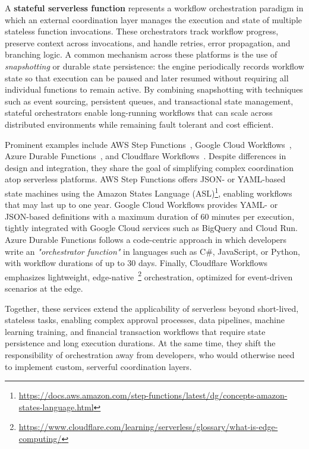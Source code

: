 A \textbf{stateful serverless function} represents a workflow orchestration paradigm in which an external coordination layer manages the execution and state of multiple stateless function invocations. These orchestrators track workflow progress, preserve context across invocations, and handle retries, error propagation, and branching logic. A common mechanism across these platforms is the use of \textit{snapshotting} or durable state persistence: the engine periodically records workflow state so that execution can be paused and later resumed without requiring all individual functions to remain active. By combining snapshotting with techniques such as event sourcing, persistent queues, and transactional state management, stateful orchestrators enable long-running workflows that can scale across distributed environments while remaining fault tolerant and cost efficient.

Prominent examples include AWS Step Functions~\cite{aws_step_functions}, Google Cloud Workflows~\cite{google_cloud_workflows}, Azure Durable Functions~\cite{azure_durable_functions}, and Cloudflare Workflows~\cite{cloudflare_workflows}. Despite differences in design and integration, they share the goal of simplifying complex coordination atop serverless platforms. AWS Step Functions offers JSON- or YAML-based state machines using the Amazon States Language (ASL)\footnote{\url{https://docs.aws.amazon.com/step-functions/latest/dg/concepts-amazon-states-language.html}}, enabling workflows that may last up to one year. Google Cloud Workflows provides YAML- or JSON-based definitions with a maximum duration of 60 minutes per execution, tightly integrated with Google Cloud services such as BigQuery and Cloud Run. Azure Durable Functions follows a code-centric approach in which developers write an \textit{"orchestrator function"} in languages such as C\#, JavaScript, or Python, with workflow durations of up to 30 days. Finally, Cloudflare Workflows emphasizes lightweight, edge-native~\footnote{\url{https://www.cloudflare.com/learning/serverless/glossary/what-is-edge-computing/}} orchestration, optimized for event-driven scenarios at the edge.

Together, these services extend the applicability of serverless beyond short-lived, stateless tasks, enabling complex approval processes, data pipelines, machine learning training, and financial transaction workflows that require state persistence and long execution durations. At the same time, they shift the responsibility of orchestration away from developers, who would otherwise need to implement custom, serverful coordination layers. 


